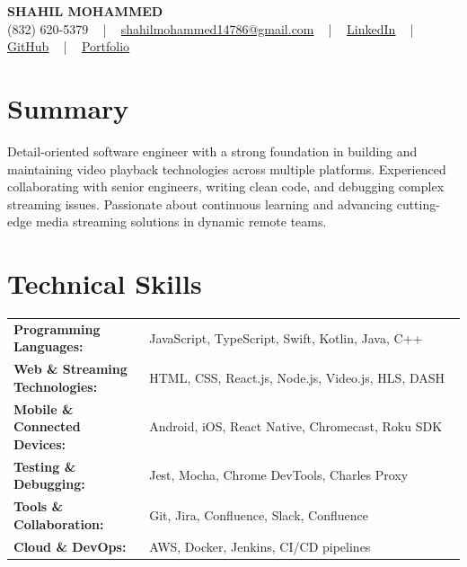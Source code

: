 \documentclass[letterpaper,11pt]{article}
\begin{document}
\begin{center}
    {\fontsize{14pt}{12pt}\selectfont \textbf{\MakeUppercase{Shahil Mohammed}}}\\ \vspace{2pt}
    \fontsize{10pt}{12pt}\selectfont (832) 620-5379 ~ | ~ \href{mailto:shahilmohammed14786@gmail.com}{shahilmohammed14786@gmail.com} ~ | ~  
    \href{https://www.linkedin.com/in/shahil-mohammed-9652931a1/}{\color{blue}\underline{LinkedIn}}  ~ | ~ 
    \href{https://github.com/freakbeast14}{\color{blue}\underline{GitHub}} ~ | ~ 
    \href{https://shahil-mohammed.netlify.app/}{\color{blue}\underline{Portfolio}}
    \vspace{-8pt}
\end{center}

\section{Summary}
\fontsize{9pt}{10pt}\selectfont
Detail-oriented software engineer with a strong foundation in building and maintaining video playback technologies across multiple platforms. Experienced collaborating with senior engineers, writing clean code, and debugging complex streaming issues. Passionate about continuous learning and advancing cutting-edge media streaming solutions in dynamic remote teams.
 \vspace{-5pt}
 
\section{Technical Skills}
        \vspace{-14pt}
        \begin{table}[h]
            \fontsize{9pt}{10pt}\selectfont
            \begin{tabular}{p{0.3\linewidth} p{0.7\linewidth}}
                \textbf{Programming Languages:} & JavaScript, TypeScript, Swift, Kotlin, Java, C++ \\
                \textbf{Web \& Streaming Technologies:} & HTML, CSS, React.js, Node.js, Video.js, HLS, DASH \\
                \textbf{Mobile \& Connected Devices:} & Android, iOS, React Native, Chromecast, Roku SDK \\
                \textbf{Testing \& Debugging:} & Jest, Mocha, Chrome DevTools, Charles Proxy \\
                \textbf{Tools \& Collaboration:} & Git, Jira, Confluence, Slack, Confluence \\
                \textbf{Cloud \& DevOps:} & AWS, Docker, Jenkins, CI/CD pipelines \\
            \end{tabular}
        \end{table}
 \vspace{-15pt}
 
\end{document}
